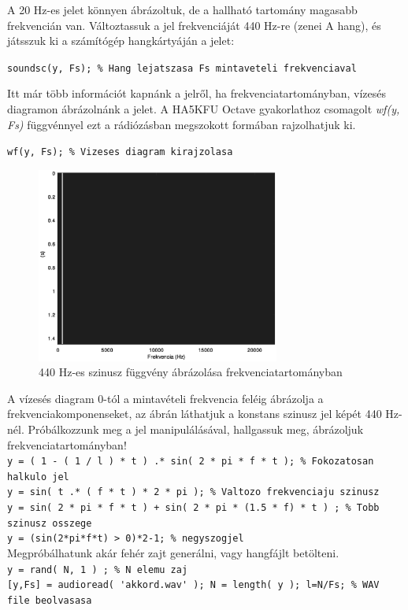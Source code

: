 \documentclass[12pt,a4paper]{article}
\begin{document}
A 20 Hz-es jelet könnyen ábrázoltuk, de a hallható tartomány magasabb frekvencián van. Változtassuk a jel frekvenciáját 440 Hz-re (zenei A hang), és játsszuk ki a számítógép hangkártyáján a jelet:


\lstinline{soundsc(y, Fs); % Hang lejatszasa Fs mintaveteli frekvenciaval } 


Itt már több információt kapnánk a jelről, ha frekvenciatartományban, vízesés diagramon ábrázolnánk a jelet. A HA5KFU Octave gyakorlathoz csomagolt \textit{wf(y, Fs)} függvénnyel ezt a rádiózásban megszokott formában rajzolhatjuk ki. 


\lstinline{wf(y, Fs); % Vizeses diagram kirajzolasa }  


\begin{figure}[H]
\begin{center}
\includegraphics[width=8cm]{figures/modulaciok_workshop_waterfall.eps}
\caption{440 Hz-es szinusz függvény ábrázolása frekvenciatartományban}
\label{fig:waterfall}
\end{center}
\end{figure}

A vízesés diagram 0-tól a mintavételi frekvencia feléig ábrázolja a frekvenciakomponenseket, az ábrán láthatjuk a konstans szinusz jel képét 440 Hz-nél. Próbálkozzunk meg a jel manipulálásával, hallgassuk meg, ábrázoljuk frekvenciatartományban!\\
\lstinline{y = ( 1 - ( 1 / l ) * t ) .* sin( 2 * pi * f * t ); % Fokozatosan halkulo jel } \\
\lstinline{y = sin( t .* ( f * t ) * 2 * pi ); % Valtozo frekvenciaju szinusz } \\
\lstinline{y = sin( 2 * pi * f * t ) + sin( 2 * pi * (1.5 * f) * t ) ; % Tobb szinusz osszege }
\\
\lstinline{y = (sin(2*pi*f*t) > 0)*2-1; % negyszogjel}
\\
Megpróbálhatunk akár fehér zajt generálni, vagy hangfájlt betölteni. \\
\lstinline{y = rand( N, 1 ) ; % N elemu zaj}  \\
\lstinline{[y,Fs] = audioread( 'akkord.wav' ); N = length( y ); l=N/Fs; % WAV file beolvasasa}
\end{document}

